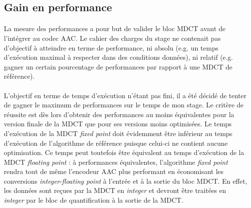 \documentclass{article}
\begin{document}



    \subsection{Gain en performance}
    \label{sec:perfs}
    \paragraph{}
    La mesure des performances a pour but de valider le bloc MDCT avant de l'intégrer au codec AAC. Le cahier des charges du stage ne contenait pas d'objectif à atteindre en terme de performance, ni absolu (e.g. un temps d'exécution maximal à respecter dans des conditions données), ni relatif (e.g. gagner un certain pourcentage de performances par rapport à une MDCT de référence).

    \paragraph{}
    L'objectif en terme de temps d'exécution n'étant pas fini, il a été décidé de tenter de gagner le maximum de performances sur le temps de mon stage. Le critère de réussite est dès lors d'obtenir des performances au moins équivalentes pour la version finale de la MDCT que pour ses versions moins optimisées. Le temps d'exécution de la MDCT \emph{fixed point} doit évidemment être inférieur au temps d'exécution de l'algorithme de référence puisque celui-ci ne contient aucune optimisation. Ce temps peut toutefois être équivalent au temps d'exécution de la MDCT \emph{floating point} : à performances équivalentes, l'algorithme \emph{fixed point} rendra tout de même l'encodeur AAC plus performant en économisant les conversions \emph{integer}-\emph{floating point} à l'entrée et à la sortie du bloc MDCT. En effet, les données sont reçues par la MDCT en \emph{integer} et devront être traitées en \emph{integer} par le bloc de quantification à la sortie de la MDCT.
    
\end{document}
